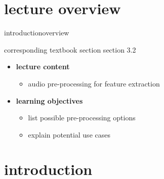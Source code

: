 


\subtitle{Module 3.2: Audio Pre-processing}


	

    \section[overview]{lecture overview}
        \begin{frame}{introduction}{overview}
            \begin{block}{corresponding textbook section}
                section 3.2
            \end{block}

            \begin{itemize}
                \item   \textbf{lecture content}
                    \begin{itemize}
                        \item   audio pre-processing for feature extraction
                    \end{itemize}
                \bigskip
                \item<2->   \textbf{learning objectives}
                    \begin{itemize}
                        \item   list possible pre-processing options 
                        \item   explain potential use cases
                    \end{itemize}
            \end{itemize}
        \end{frame}

    \section[intro]{introduction}

